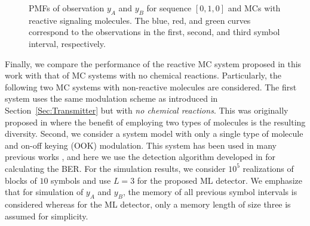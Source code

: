\documentclass[conference]{IEEEtran}
\begin{document}
\begin{figure} 
  \centering\vspace{-0.1cm}
\hspace{-0.6cm}
 \vspace{-0.4cm}
\caption{PMFs of observation $y_A$ and $y_B$ for sequence $[0,1,0]$ and MCs with reactive signaling molecules. The blue, red, and green curves correspond to the observations in the first, second, and third symbol interval, respectively. \vspace{-0.5cm} }
\label{Fig:Poisson_PDF}
\end{figure}

Finally, we compare the performance of the reactive MC system proposed in this work with that of MC systems with no chemical reactions. Particularly, the following two MC systems with non-reactive molecules are considered. The first system uses the same modulation scheme as introduced in Section~\ref{Sec:Transmitter} but with {\em no chemical reactions}. This was originally proposed in \cite{Gau_AB} where the benefit of employing two types of molecules is the resulting diversity. Second, we consider a system model with only a single type of molecule and on-off keying (OOK) modulation. This system has been used in many previous works \cite{Nariman_Survey}, and here we use the detection algorithm developed in \cite[Eq.~(6)]{NanoCOM16} for calculating the BER. For the simulation results, we consider $10^5$ realizations of blocks of $10$ symbols and use $L=3$ for the proposed ML detector. We emphasize that for simulation of $y_A$ and $y_B$, the memory of all previous symbol intervals is considered whereas for the ML detector, only a memory length of size three is assumed for simplicity. 
\end{document}
